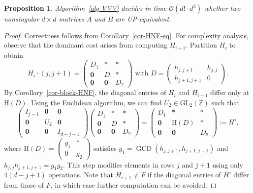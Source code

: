\documentclass[reqno, 12pt]{article}
\newtheorem{prop}[thm]{Proposition}
\theoremstyle{mydefinition}
\theoremstyle{myremark}
\numberwithin{algorithm}{section}
\newcommand{\h}{{\mathrm{H}}}
\begin{document}
\begin{prop}
Algorithm~\ref{alg-VVV} decides in time $\mathcal O(d!\cdot d^3)$ whether two nonsingular $d\times d$ matrices $A$ and $B$ are UP-equivalent.
\end{prop}

\begin{proof}
Correctness follows from Corollary~\ref{cor-HNF-eq}. For complexity analysis, observe that the dominant cost arises from computing $H_{i+1}$.
Partition $H_i$ to obtain
$$
H_i \cdot (j,j+1)=\begin{pmatrix}
D_1 & * &* \\
\mathbf 0 &   D  & * \\
\mathbf 0 & \mathbf 0 & D_2
\end{pmatrix} \text{ with } D= \begin{pmatrix}
                                  h_{j,j+1}  & h_{j,j} \\
                                 h_{j+1,j+1}& 0
                               \end{pmatrix}.
$$
By Corollary~\ref{cor-block-HNF}, the diagonal entries of $H_i$ and $H_{i+1}$ differ only at $\h(D)$. Using the Euclidean algorithm,
we can find $U_2 \in \mathrm{GL}_2(\mathbb{Z})$ such that
\[
  \begin{pmatrix}
     I_{j-1} & \mathbf 0 & \mathbf 0 \\
     \mathbf 0 & U_2 & \mathbf 0 \\
     \mathbf 0 & \mathbf 0 &  I_{d-j-1}
   \end{pmatrix} \begin{pmatrix}
D_1 & *&* \\
\mathbf 0 &   D  & * \\
\mathbf 0 & \mathbf 0 & D_2
\end{pmatrix} = \begin{pmatrix}
D_1 & *&* \\
\mathbf 0 &   \h(D)  & * \\
\mathbf 0 & \mathbf 0 & D_2
\end{pmatrix}:= H' ,
\]  where $\h(D)=\begin{pmatrix}
     g_1 & * \\
      0 & g_2
\end{pmatrix}$ satisfies $g_1 = \operatorname{GCD}(h_{j,j+1}, h_{j+1,j+1})$ and $h_{j,j} h_{j+1,j+1} = g_1 g_2$.
This step modifies elements in rows $j$ and $j+1$ using only \(4(d-j+1)\) operations. Note that $H_{i+1}\neq F$ if the diagonal entries of $H'$ differ from those of $F$, in which case further computation can be avoided.



\end{proof}
\end{document}
